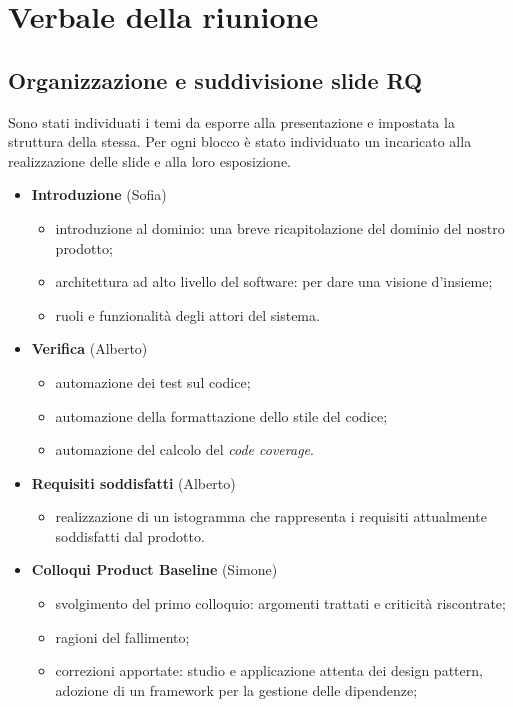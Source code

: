 \section{Verbale della riunione}
\subsection{Organizzazione e suddivisione slide RQ}

Sono stati individuati i temi da esporre alla presentazione e impostata la struttura della stessa. Per ogni blocco è stato individuato un incaricato alla realizzazione delle slide e alla loro esposizione.

\begin{itemize}
	\item \textbf{Introduzione} (Sofia)
	\begin{itemize}
		\item introduzione al dominio: una breve ricapitolazione del dominio del nostro prodotto;
		\item architettura ad alto livello del software: per dare una visione d'insieme;
		\item ruoli e funzionalità degli attori del sistema.
	\end{itemize}
	\item \textbf{Verifica} (Alberto)
	\begin{itemize}
		\item automazione dei test sul codice;
		\item automazione della formattazione dello stile del codice;
		\item automazione del calcolo del \textit{code coverage}.
	\end{itemize}
	\item \textbf{Requisiti soddisfatti} (Alberto)
	\begin{itemize}
		\item realizzazione di un istogramma che rappresenta i requisiti attualmente soddisfatti dal prodotto.
	\end{itemize}
	\item \textbf{Colloqui Product Baseline} (Simone)
	\begin{itemize}
		\item svolgimento del primo colloquio: argomenti trattati e criticità riscontrate;
		\item ragioni del fallimento;
		\item correzioni apportate: studio e applicazione attenta dei design pattern, adozione di un framework per la gestione delle dipendenze;

\end{itemize}
\end{itemize}
